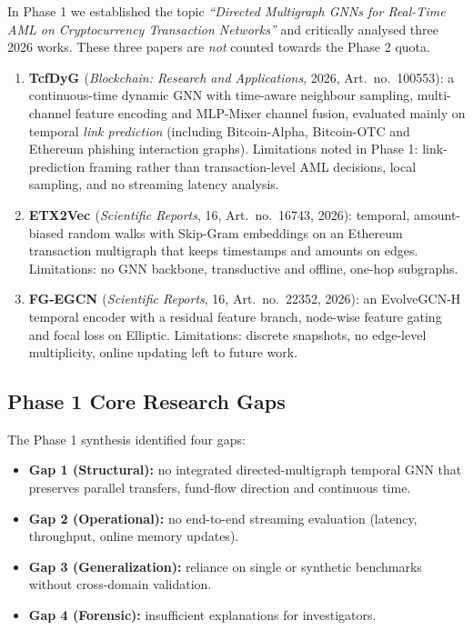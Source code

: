 \documentclass[11pt,a4paper]{article}
\begin{document}
In Phase 1 we established the topic \textit{``Directed Multigraph GNNs for Real-Time AML on Cryptocurrency Transaction Networks''} and critically analysed three 2026 works. These three papers are \emph{not} counted towards the Phase 2 quota.
\begin{enumerate}[leftmargin=*]
    \item \textbf{TcfDyG \cite{li2026tcfdyg}} (\textit{Blockchain: Research and Applications}, 2026, Art.\ no.\ 100553): a continuous-time dynamic GNN with time-aware neighbour sampling, multi-channel feature encoding and MLP-Mixer channel fusion, evaluated mainly on temporal \emph{link prediction} (including Bitcoin-Alpha, Bitcoin-OTC and Ethereum phishing interaction graphs). Limitations noted in Phase 1: link-prediction framing rather than transaction-level AML decisions, local sampling, and no streaming latency analysis.
    \item \textbf{ETX2Vec \cite{lu2026etx2vec}} (\textit{Scientific Reports}, 16, Art.\ no.\ 16743, 2026): temporal, amount-biased random walks with Skip-Gram embeddings on an Ethereum transaction multigraph that keeps timestamps and amounts on edges. Limitations: no GNN backbone, transductive and offline, one-hop subgraphs.
    \item \textbf{FG-EGCN \cite{han2026fgegcn}} (\textit{Scientific Reports}, 16, Art.\ no.\ 22352, 2026): an EvolveGCN-H temporal encoder with a residual feature branch, node-wise feature gating and focal loss on Elliptic. Limitations: discrete snapshots, no edge-level multiplicity, online updating left to future work.
\end{enumerate}

\subsection{Phase 1 Core Research Gaps}
The Phase 1 synthesis identified four gaps:
\begin{itemize}[leftmargin=*]
    \item \textbf{Gap 1 (Structural):} no integrated directed-multigraph temporal GNN that preserves parallel transfers, fund-flow direction and continuous time.
    \item \textbf{Gap 2 (Operational):} no end-to-end streaming evaluation (latency, throughput, online memory updates).
    \item \textbf{Gap 3 (Generalization):} reliance on single or synthetic benchmarks without cross-domain validation.
    \item \textbf{Gap 4 (Forensic):} insufficient explanations for investigators.
\end{itemize}
\end{document}
